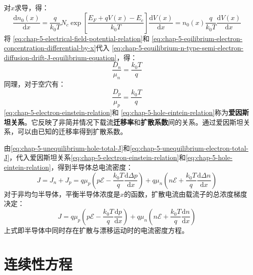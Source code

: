 对$x$求导，得：
\begin{equation}
    \frac{\mathrm{d}n_0(x)}{\mathrm{d}x}=\frac{q}{k_0T}N_c\exp{\left[\frac{E_F+qV(x)-E_c}{k_0T}\right]}\frac{\mathrm{d}V(x)}{\mathrm{d}x}=n_0(x)\frac{q}{k_0T}\frac{\mathrm{d}V(x)}{\mathrm{d}x}\label{eq:chap-5-eqilibrium-electron-concentration-differential-by-x}
\end{equation}
将 \autoref{eq:chap-5-electrical-field-potential-relation}和 \autoref{eq:chap-5-eqilibrium-electron-concentration-differential-by-x}代入 \autoref{eq:chap-5-equilibrium-n-type-semi-electron-diffusion-drift-J-equilibrium-equation}，得：
\begin{equation}
    \frac{D_n}{\mu_n}=\frac{k_0T}{q}\label{eq:chap-5-electron-einstein-relation}
\end{equation}
同理，对于空穴有：
\begin{equation}
    \frac{D_p}{\mu_p}=\frac{k_0T}{q}\label{eq:chap-5-hole-eintein-relation}
\end{equation}
\autoref{eq:chap-5-electron-einstein-relation}和 \autoref{eq:chap-5-hole-eintein-relation}称为\textbf{爱因斯坦关系}。它反映了非简并情况下载流\textbf{迁移率}和\textbf{扩散系数}间的关系。通过爱因斯坦关系，可以由已知的迁移率得到扩散系数。

由\autoref{eq:chap-5-unequilibrium-hole-total-J}和\autoref{eq:chap-5-unequilibrium-electron-total-J}，代入爱因斯坦关系\autoref{eq:chap-5-electron-einstein-relation}和\autoref{eq:chap-5-hole-eintein-relation}，得到半导体总电流密度：
\begin{equation}
    J=J_n+J_p=q\mu_p\left(p\mathscr{E}-\frac{k_0T}{q}\frac{\mathrm{d}\Delta p}{\mathrm{d}x}\right)+q\mu_n\left(n\mathscr{E}+\frac{k_0T}{q}\frac{\mathrm{d}\Delta n}{\mathrm{d}x}\right)
\end{equation}
对于非均匀半导体，平衡半导体浓度是$x$的函数，扩散电流由载流子的总浓度梯度决定：
\begin{equation}
    J=q\mu_p\left(p\mathscr{E}-\frac{k_0T}{q}\frac{\mathrm{d}p}{\mathrm{d}x}\right)+q\mu_n\left(n\mathscr{E}+\frac{k_0T}{q}\frac{\mathrm{d}n}{\mathrm{d}x}\right)
\end{equation}
上式即半导体中同时存在扩散与漂移运动时的电流密度方程。

\section{连续性方程}











